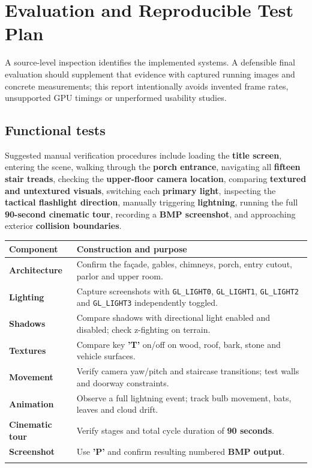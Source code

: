 \documentclass[10pt,a4paper,oneside]{article}
\begin{document}
\section{Evaluation and Reproducible Test Plan}
A source-level inspection identifies the implemented systems. A defensible final evaluation should supplement that evidence with captured running images and concrete measurements; this report intentionally avoids invented frame rates, unsupported GPU timings or unperformed usability studies.

\subsection{Functional tests}
Suggested manual verification procedures include loading the \textbf{title screen}, entering the scene, walking through the \textbf{porch entrance}, navigating all \textbf{fifteen stair treads}, checking the \textbf{upper-floor camera location}, comparing \textbf{textured and untextured visuals}, switching each \textbf{primary light}, inspecting the \textbf{tactical flashlight direction}, manually triggering \textbf{lightning}, running the full \textbf{90-second cinematic tour}, recording a \textbf{BMP screenshot}, and approaching exterior \textbf{collision boundaries}.

\begin{longtable}{p{}p{}}\toprule\textbf{Component} & \textbf{Construction and purpose}\\\midrule\endhead

\textbf{Architecture} & Confirm the façade, gables, chimneys, porch, entry cutout, parlor and upper room.\\\addlinespace[3pt]

\textbf{Lighting} & Capture screenshots with \texttt{GL\_LIGHT0}, \texttt{GL\_LIGHT1}, \texttt{GL\_LIGHT2} and \texttt{GL\_LIGHT3} independently toggled.\\\addlinespace[3pt]

\textbf{Shadows} & Compare shadows with directional light enabled and disabled; check z-fighting on terrain.\\\addlinespace[3pt]

\textbf{Textures} & Compare key \textbf{'T'} on/off on wood, roof, bark, stone and vehicle surfaces.\\\addlinespace[3pt]

\textbf{Movement} & Verify camera yaw/pitch and staircase transitions; test walls and doorway constraints.\\\addlinespace[3pt]

\textbf{Animation} & Observe a full lightning event; track bulb movement, bats, leaves and cloud drift.\\\addlinespace[3pt]

\textbf{Cinematic tour} & Verify stages and total cycle duration of \textbf{90 seconds}.\\\addlinespace[3pt]

\textbf{Screenshot} & Use \textbf{'P'} and confirm resulting numbered \textbf{BMP output}.\\\addlinespace[3pt]

\bottomrule\end{longtable}
\end{document}
